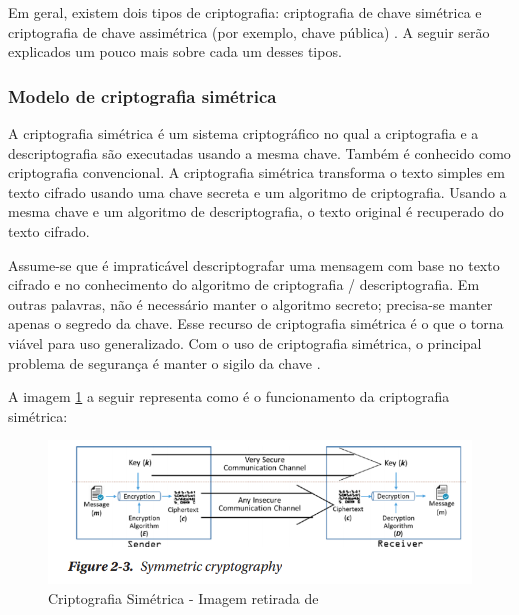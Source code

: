     Em geral, existem dois tipos de criptografia: criptografia de chave simétrica e criptografia de chave assimétrica (por exemplo, chave pública) . A seguir serão explicados um pouco mais sobre cada um desses tipos.

        \subsubsection{Modelo de criptografia simétrica}
        
            A criptografia simétrica é um sistema criptográfico no qual a criptografia e a descriptografia são executadas usando a mesma chave. Também é conhecido como criptografia convencional. A criptografia simétrica transforma o texto simples em texto cifrado usando uma chave secreta e um algoritmo de criptografia. Usando a mesma chave e um algoritmo de descriptografia, o texto original é recuperado do texto cifrado.\cite{cryptograpy_and_network_stallings}
            
            Assume-se que é impraticável descriptografar uma mensagem com base no texto cifrado e no conhecimento do algoritmo de criptografia / descriptografia. Em outras palavras, não é necessário manter o algoritmo secreto; precisa-se manter apenas o segredo da chave. Esse recurso de criptografia simétrica é o que o torna viável para uso generalizado. Com o uso de criptografia simétrica, o principal problema de segurança é manter o sigilo da chave \cite{cryptograpy_and_network_stallings}.
            
            A imagem \ref{fig:imagem_criptografia_simetrica} a seguir representa como é o funcionamento da criptografia simétrica:
            
            \begin{figure}[H]
                 \centering
                 \includegraphics[scale=0.6]{figuras/capitulo_2/criptografia_simetrica.png}
                 \caption{Criptografia Simétrica - Imagem retirada de \cite{beginnig_blockchain_bikramaditya}}
                 \label{fig:imagem_criptografia_simetrica}
            \end{figure}
            
